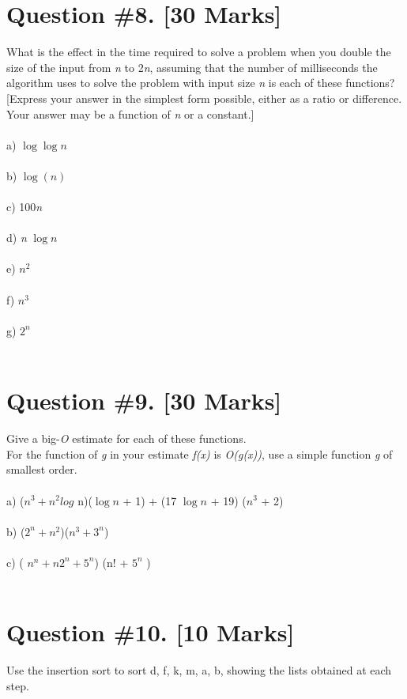 \documentclass{article}
\begin{document}
\section{Question \#8. [30 Marks]}
What is the effect in the time required to solve a problem when you double the size of the input from \emph{n} to 2\emph{n}, assuming that the number of milliseconds the algorithm uses to solve the problem with input size \emph{n} is each of these functions? [Express your answer in the simplest form possible, either as a ratio or difference. Your answer may be a function of \emph{n} or a constant.] \\ \\  
a) $\log\log{n}$ \\ \\ 
b) $\log(n)$ \\ \\ 
c) 100\emph{n} \\ \\ 
d) \emph{n} $\log{n}$ \\ \\ 
e) $n^2$ \\ \\ 
f)  $n^3$ \\ \\ 
g) $2^n$ \\ \\ 
\newpage
\section{Question \#9. [30 Marks]}
Give a big-\emph{O} estimate for each of these functions. \\
For the function of \emph{g} in your estimate \emph{f(x)} is \emph{O(g(x))}, use a simple function \emph{g} of smallest order. \\ \\ 
a) ($n^3 + n^2log$ n)($\log{n}$ + 1) + (17 $\log{n}$ + 19) ($n^3$ + 2) \\ \\ 
b) ($2^n + n^2$)($n^3 + 3^n$) \\ \\ 
c) ( $n^n + n2^n + 5^n$) (n! + $5^n$ ) \\ \\ 

\newpage

\section{Question \#10. [10 Marks]} 
Use the insertion sort to sort d, f, k, m, a, b, showing the lists obtained at each step. 
\newpage
\end{document}
